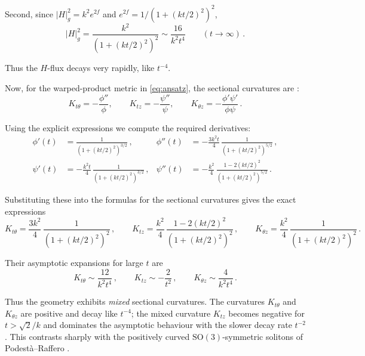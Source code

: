 \documentclass[12pt,a4paper,reqno]{amsart}
\theoremstyle{plain}
\theoremstyle{remark}
\numberwithin{equation}{section}
\begin{document}
Second, since $|H|_{g}^{2}=k^{2}e^{2f}$ and $e^{2f}=1/(1+(kt/2)^{2})^{2}$,
\begin{equation*}
|H|_{g}^{2}= \frac{k^{2}}{\left(1+(kt/2)^{2}\right)^{2}} \sim \frac{16}{k^{2}t^{4}} \qquad (t\to\infty) \,.
\end{equation*}

Thus the $H$-flux decays very rapidly, like $t^{-4}$.

Now, for the warped-product metric in \eqref{eq:ansatz}, the sectional curvatures are \cite{Petersen2016}:
\begin{equation*}
K_{t\theta} = -\frac{\phi''}{\phi},\qquad 
K_{tz} = -\frac{\psi''}{\psi},\qquad 
K_{\theta z} = -\frac{\phi'\psi'}{\phi\psi} \,.
\end{equation*}

Using the explicit expressions we compute the required derivatives:
\begin{align*}
\phi'(t) &= \frac{1}{\left(1+(kt/2)^2\right)^{3/2}} \,, &
\phi''(t) &= -\frac{3k^2 t}{4}\,\frac{1}{\left(1+(kt/2)^2\right)^{5/2}} \,, \\[5pt]
\psi'(t) &= -\frac{k^2 t}{4}\,\frac{1}{\left(1+(kt/2)^2\right)^{3/2}} \,, &
\psi''(t) &= - \frac{k^2}{4}\,\frac{1-2(kt/2)^2}{\left(1+(kt/2)^2\right)^{5/2}} \,.
\end{align*}

Substituting these into the formulas for the sectional curvatures gives the exact expressions
\begin{equation}\label{eq:sectionalcurvaturesC0}
K_{t\theta} = \frac{3k^{2}}{4} \,\frac{1}{\left(1+(kt/2)^{2}\right)^{2}} \,, \qquad K_{tz} = \frac{k^{2}}{4} \,\frac{1-2(kt/2)^{2}}{\left(1+(kt/2)^{2}\right)^{2}} \,, \qquad K_{\theta z} = \frac{k^{2}}{4} \,\frac{1}{\left(1+(kt/2)^{2}\right)^{2}} \,.
\end{equation}

Their asymptotic expansions for large $t$ are
\begin{equation*}
K_{t\theta} \sim \frac{12}{k^{2}t^{4}} \,, \qquad
K_{tz} \sim - \frac{2}{t^{2}} \,, \qquad
K_{\theta z} \sim \frac{4}{k^{2}t^{4}} \,.
\end{equation*}

Thus the geometry exhibits \emph{mixed} sectional curvatures.  
The curvatures $K_{t\theta}$ and $K_{\theta z}$ are positive and decay like $t^{-4}$; the mixed curvature $K_{tz}$ becomes negative for $t>\sqrt{2}/k$ and dominates the asymptotic behaviour with the slower decay rate $t^{-2}$. This contrasts sharply with the positively curved $\mathrm{SO}(3)$-symmetric solitons of Podestà--Raffero \cite{PodestaRaffero2025}.
\end{document}
